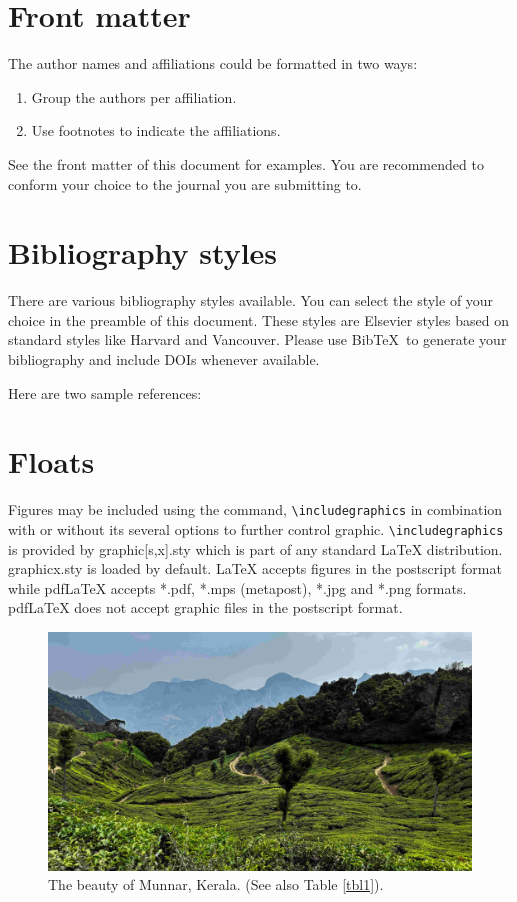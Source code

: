 \documentclass[a4paper,fleqn]{cas-dc}
\begin{document}
\section{Front matter}

The author names and affiliations could be formatted in two ways:
\begin{enumerate}[(1)]
\item Group the authors per affiliation.
\item Use footnotes to indicate the affiliations.
\end{enumerate}
See the front matter of this document for examples. 
You are recommended to conform your choice to the journal you 
are submitting to.

\section{Bibliography styles}

There are various bibliography styles available. You can select the
style of your choice in the preamble of this document. These styles are
Elsevier styles based on standard styles like Harvard and Vancouver.
Please use Bib\TeX\ to generate your bibliography and include DOIs
whenever available.

Here are two sample references: 
\cite{Fortunato2010}
\cite{Fortunato2010,NewmanGirvan2004}
\cite{Fortunato2010,Vehlowetal2013}

\section{Floats}
{Figures} may be included using the command,\linebreak 
\verb+\includegraphics+ in
combination with or without its several options to further control
graphic. \verb+\includegraphics+ is provided by {graphic[s,x].sty}
which is part of any standard \LaTeX{} distribution.
{graphicx.sty} is loaded by default. \LaTeX{} accepts figures in
the postscript format while pdf\LaTeX{} accepts {*.pdf},
{*.mps} (metapost), {*.jpg} and {*.png} formats. 
pdf\LaTeX{} does not accept graphic files in the postscript format. 

\begin{figure}
	\centering
	\includegraphics[width=.9\columnwidth]{figs/cas-munnar-2024.jpg}
	\caption{The beauty of Munnar, Kerala. (See also Table \protect\ref{tbl1}).}
	\label{FIG:1}
\end{figure}
\end{document}
